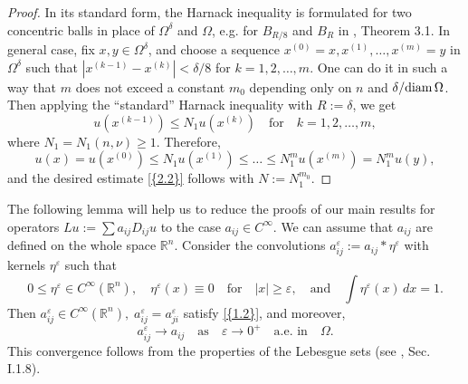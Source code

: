 \documentclass[regno,12pt]{amsart}
\theoremstyle{definition}
\theoremstyle{remark}
\begin{document}
\begin{proof}
    In its standard form, the Harnack inequality is formulated for two concentric balls in place of $\Omega^{\delta}$ and $\Omega$, e.g. for $B_{R/8}$ and $B_R$ in \cite{S80}, Theorem 3.1. In general case, fix $x,y\in\Omega^{\delta}$, and choose a sequence $x^{(0)}=x,x^{(1)},\ldots,x^{(m)}=y$ in $\Omega^{\delta}$ such that $|x^{(k-1)}-x^{(k)}|<\delta/8$ for $k=1,2,\ldots,m$. One can do it in such a way that $m$ does  not exceed a constant $m_0$ depending only on $n$ and $\delta/{{\rm diam}\,} \Omega$. Then applying the ``standard'' Harnack inequality with $R:=\delta$, we get
    \[ u(x^{(k-1)})\le N_1 u(x^{(k)})
    {\quad\text{{for}}\quad} k=1,2,\ldots,m,\]
    where $N_1=N_1(n,\nu)\ge 1$. Therefore,
    \[ u(x)=u(x^{(0)})\le N_1u(x^{(1)})\le \ldots \le N_1^m u(x^{(m)})=N_1^m u(y),\]
    and the desired estimate {\eqref{{2.2}}} follows with $N:=N_1^{m_0}$.
\end{proof}

The following lemma will help us to reduce the proofs of our main results for operators $Lu:=\sum a_{ij}D_{ij}u$ to the case $a_{ij}\in C^{\infty}$. We can assume that $a_{ij}$ are defined on the whole space ${{\mathbb R}^n}$. Consider the convolutions $a_{ij}^{\varepsilon}:=a_{ij}*\eta^{\varepsilon}$ with kernels $\eta^{\varepsilon}$ such that
    \[ 0\le \eta^{\varepsilon}\in C^{\infty}({{\mathbb R}^n}),\quad
    \eta^{\varepsilon}(x){\equiv} 0{\quad\text{{for}}\quad} |x|\ge {\varepsilon},
    {\quad\text{{and}}\quad} \int\eta^{\varepsilon}(x)\,dx=1.\]
Then $a_{ij}^{\varepsilon}\in C^{\infty}({{\mathbb R}^n}),\; a_{ij}^{\varepsilon}=a_{ji}^{\varepsilon}$ satisfy {\eqref{{1.2}}}, and moreover,
\begin{equation}\label{2.3}
    a_{ij}^{\varepsilon}\to a_{ij}{\quad\text{{as}}\quad}{\varepsilon}\to 0^+
    {\quad\text{{a.e. in}}\quad}\Omega.
\end{equation}
This convergence follows from the properties of the Lebesgue sets (see \cite{St70}, Sec. I.1.8).
\end{document}
